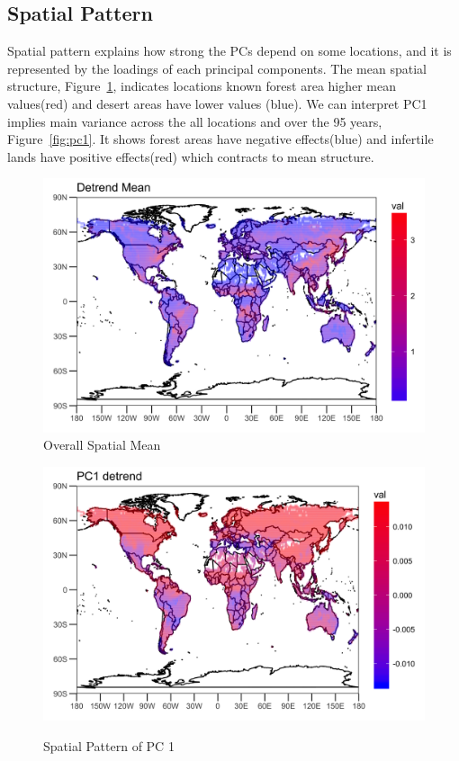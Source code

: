\documentclass[11pt]{article}
\begin{document}
\subsection{Spatial Pattern}
Spatial pattern explains how strong the PCs depend on some locations, and it is represented by the loadings of each principal components. The mean spatial structure, Figure~\ref{fig:scalepcade}, indicates locations known forest area higher mean values(red) and desert areas have lower values (blue).  We can interpret PC1 implies main variance across the all locations and over the 95 years, Figure~\ref{fig:pc1}. It shows forest areas have negative effects(blue) and infertile lands have positive effects(red) which contracts to mean structure. 
\begin{figure}
	\centering
	\includegraphics[width=0.7\linewidth]{../img/Scale_PCA_de}
	\caption{Overall Spatial Mean}
	\label{fig:scalepcade}
\end{figure}

\begin{figure}
	\centering
	{\includegraphics[width=0.7\linewidth]{../img/loading_PC1_de}}\label{fig:pc1-spatial}
	\caption{Spatial Pattern of PC 1}
\end{figure}
\end{document}
